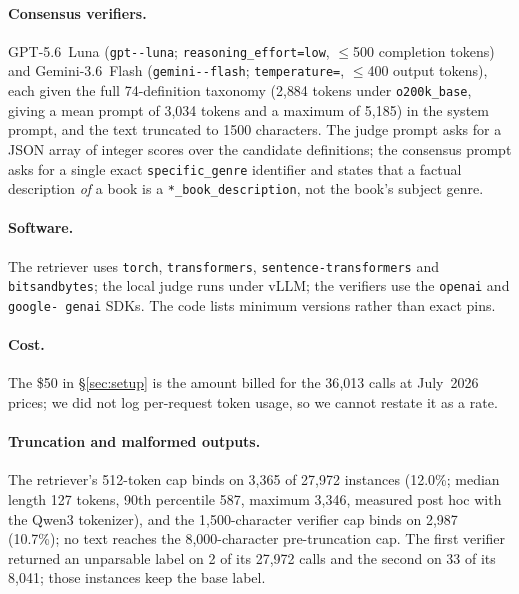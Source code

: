 \documentclass[11pt]{article}
\begin{document}
\paragraph{Consensus verifiers.} GPT-5.6~Luna (\texttt{gpt--\allowbreak luna};
\texttt{reasoning\_\allowbreak effort=\allowbreak low}, $\leq$500 completion tokens) and
Gemini-3.6~Flash (\texttt{gemini--\allowbreak flash};
\texttt{temperature=}, $\leq$400 output tokens), each given the full 74-definition taxonomy
(2{,}884 tokens under \texttt{o200k\_base}, giving a mean prompt of 3{,}034 tokens and a maximum
of 5{,}185) in the system prompt, and the text truncated to 1500 characters. The judge prompt asks for a
JSON array of integer scores over the candidate definitions; the consensus prompt asks for a single exact
\texttt{specific\_genre} identifier and states that a factual description \emph{of} a book is a
\texttt{*\_book\_description}, not the book's subject genre.

\paragraph{Software.} The retriever uses \texttt{torch}, \texttt{trans\-\allowbreak formers},
\texttt{sentence-\allowbreak transformers} and \texttt{bitsand\-\allowbreak bytes}; the local
judge runs under vLLM; the verifiers use the \texttt{openai} and \texttt{google-\allowbreak
genai} SDKs. The code lists minimum versions rather than exact pins.

\paragraph{Cost.} The \$50 in \S\ref{sec:setup} is the amount billed for the 36{,}013 calls at
July~2026 prices; we did not log per-request token usage, so we cannot restate it as a rate.

\paragraph{Truncation and malformed outputs.} The retriever's 512-token cap binds on 3{,}365 of
27{,}972 instances (12.0\%; median length 127 tokens, 90th percentile 587, maximum 3{,}346,
measured post hoc with the Qwen3 tokenizer), and the 1{,}500-character verifier cap binds on
2{,}987 (10.7\%); no text reaches the 8{,}000-character pre-truncation cap. The first verifier returned an unparsable label on 2 of its 27{,}972 calls
and the second on 33 of its 8{,}041; those instances keep the base label.
\end{document}

